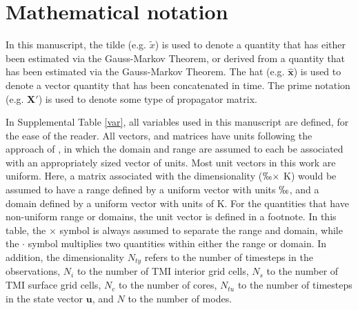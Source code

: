 \documentclass[draft]{agujournal2019}
\begin{document}
\clearpage
\section{Mathematical notation}
In this manuscript, the tilde (e.g. $\tilde{x}$) is used to denote a quantity that has either been estimated via the Gauss-Markov Theorem, or derived from a quantity that has been estimated via the Gauss-Markov Theorem. The hat (e.g. $\hat{\mathbf{x}}$) is used to denote a vector quantity that has been concatenated in time. The prime notation (e.g. $\mathbf{X}'$) is used to denote some type of propagator matrix. 

In Supplemental Table \ref{var}, all variables used in this manuscript are defined, for the ease of the reader. All vectors, and matrices have units following the approach of , in which the domain and range are assumed to each be associated with an appropriately sized vector of units. Most unit vectors in this work are uniform. Here, a matrix associated with the dimensionality ($\permil \times$ K) would be assumed to have a range defined by a uniform vector with units $\permil$, and a domain defined by a uniform vector with units of K. For the quantities that have non-uniform range or domains, the unit vector is defined in a footnote. In this table, the $\times$ symbol is always assumed to separate the range and domain, while the $\cdot$ symbol multiplies two quantities within either the range or domain. In addition, the dimensionality $N_{ty}$ refers to the number of timesteps in the observations, $N_{i}$ to the number of TMI interior grid cells, $N_{s}$ to the number of TMI surface grid cells, $N_{c}$ to the number of cores, $N_{tu}$ to the number of timesteps in the state vector $\mathbf{u}$, and $N$ to the number of modes.
\end{document}
